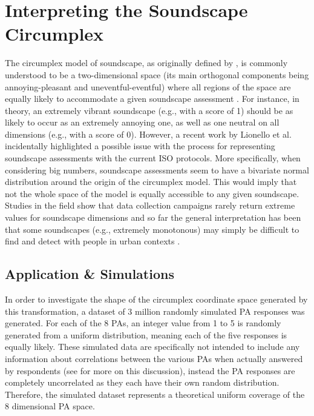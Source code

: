 \section{Interpreting the Soundscape Circumplex}
The circumplex model of soundscape, as originally defined by \citet{Axelsson2010principal}, is commonly understood to be a two-dimensional space (its main orthogonal components being annoying-pleasant and uneventful-eventful) where all regions of the space are equally likely to accommodate a given soundscape assessment \citep{Aletta2016Soundscape}. For instance, in theory, an extremely vibrant soundscape (e.g., with a score of 1) should be as likely to occur as an extremely annoying one, as well as one neutral on all dimensions (e.g., with a score of 0). However, a recent work by Lionello et al. \citep{Lionello2021Introducing} incidentally highlighted a possible issue with the process for representing soundscape assessments with the current ISO protocols. More specifically, when considering big numbers, soundscape assessments seem to have a bivariate normal distribution around the origin of the circumplex model. This would imply that not the whole space of the model is equally accessible to any given soundscape. Studies in the field show that data collection campaigns rarely return extreme values for soundscape dimensions \citep{Mancini2021Soundwalk} and so far the general interpretation has been that some soundscapes (e.g., extremely monotonous) may simply be difficult to find and detect with people in urban contexts \citep{Sun2019Classification}.

\subsection{Application \& Simulations}
In order to investigate the shape of the circumplex coordinate space generated by this transformation, a dataset of 3 million randomly simulated PA responses was generated. For each of the 8 PAs, an integer value from 1 to 5 is randomly generated from a uniform distribution, meaning each of the five responses is equally likely. These simulated data are specifically not intended to include any information about correlations between the various PAs when actually answered by respondents (see \citep{Lionello2021Introducing} for more on this discussion), instead the PA responses are completely uncorrelated as they each have their own random distribution. Therefore, the simulated dataset represents a theoretical uniform coverage of the 8 dimensional PA space.

